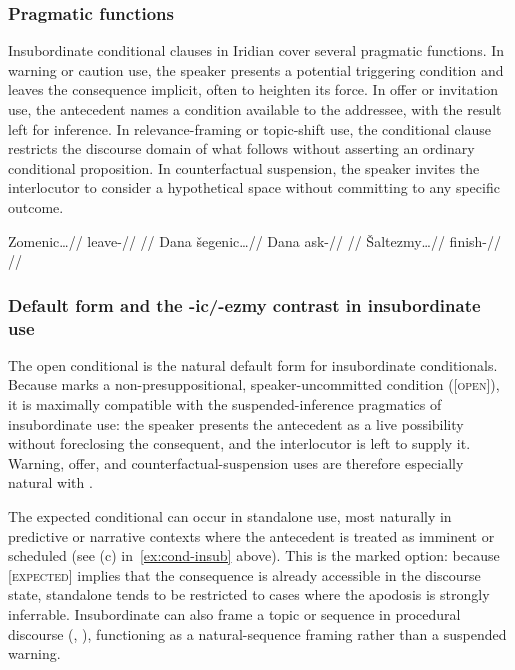 \subsubsection{Pragmatic functions}

Insubordinate conditional clauses in Iridian cover several pragmatic
functions. In warning or caution use, the speaker presents a potential
triggering condition and leaves the consequence implicit, often to
heighten its force. In offer or invitation use, the antecedent names a
condition available to the addressee, with the result left for inference.
In relevance-framing or topic-shift use, the conditional clause restricts
the discourse domain of what follows without asserting an ordinary
conditional proposition. In counterfactual suspension, the speaker
invites the interlocutor to consider a hypothetical space without
committing to any specific outcome.

\pex \label{ex:cond-insub}
\a
\begingl
\gla Zomenic\ldots//
\glb leave-\Cond{}//
\glft {} //
\endgl
\a
\begingl
\gla Dana šegenic\ldots//
\glb Dana ask-\Cond{}//
\glft {} //
\endgl
\a
\begingl
\gla Šaltezmy\ldots//
\glb finish-\ECond{}//
\glft {} //
\endgl
\xe

\subsubsection{Default form and the -ic/-ezmy contrast in insubordinate use}

The open conditional  is the natural default form for
insubordinate conditionals. Because  marks a
non-presuppositional, speaker-uncommitted condition ([\textsc{open}]),
it is maximally compatible with the suspended-inference pragmatics of
insubordinate use: the speaker presents the antecedent as a live
possibility without foreclosing the consequent, and the interlocutor is
left to supply it. Warning, offer, and counterfactual-suspension uses are
therefore especially natural with .

The expected conditional  can occur in standalone use, most
naturally in predictive or narrative contexts where the antecedent is
treated as imminent or scheduled (see (c) in~\ref{ex:cond-insub} above).
This is the marked option: because [\textsc{expected}] implies that the
consequence is already accessible in the discourse state, standalone
 tends to be restricted to cases where the apodosis is
strongly inferrable. Insubordinate  can also frame a topic
or sequence in procedural discourse (,
), functioning as a natural-sequence
framing rather than a suspended warning.

